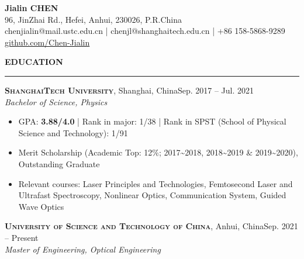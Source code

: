 \documentclass[letterpaper,11pt]{article}
\begin{document}
\begin{center}
    {\LARGE\bfseries{}Jialin CHEN}\\
    \vspace{1ex}
    96, JinZhai Rd., Hefei, Anhui, 230026, P.R.China\\
    chenjialin@mail.ustc.edu.cn | chenjl@shanghaitech.edu.cn | +86 158-5868-9289\\
    \href{https://github.com/Chen-Jialin}{github.com/Chen-Jialin}\\
\end{center}
\vspace{-1ex}

{\Large\bfseries{}EDUCATION}\\
\vspace{-1ex}
\rule[1.5ex]{\columnwidth}{1pt}
{\large\bfseries\scshape{}ShanghaiTech University}, {Shanghai, China}\hfill{Sep. 2017 -- Jul. 2021}\\
{\itshape{}Bachelor of Science, Physics}\\
\vspace{-4ex}
\begin{itemize}
    \item GPA: \textbf{3.88/4.0} | Rank in major: 1/38 | Rank in SPST (School of Physical Science and Technology): 1/91
    \item Merit Scholarship (Academic Top: 12\%; 2017\textasciitilde2018, 2018\textasciitilde2019 \& 2019\textasciitilde2020), Outstanding Graduate
    \item Relevant courses: Laser Principles and Technologies, Femtosecond Laser and Ultrafast Spectroscopy, Nonlinear Optics, Communication System, Guided Wave Optics
\end{itemize}
{\large\bfseries\scshape{}University of Science and Technology of China}, {Anhui, China}\hfill{Sep. 2021 -- Present}\\
{\itshape{}Master of Engineering, Optical Engineering}\\
\vspace{-2ex}%
\end{document}
